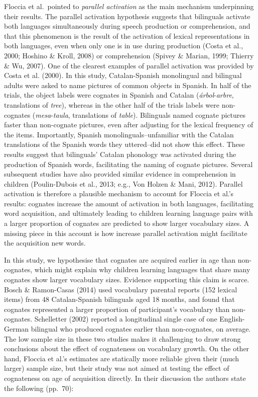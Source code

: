 \documentclass[
  letterpaper,
  DIV=11,
  numbers=noendperiod]{scrartcl}
\begin{document}
Floccia et al.~pointed to \emph{parallel activation} as the main
mechanism underpinning their results. The parallel activation hypothesis
suggests that bilinguals activate both languages simultaneously during
speech production or comprehension, and that this phenomenon is the
result of the activation of lexical representations in both languages,
even when only one is in use during production (Costa et al., 2000;
Hoshino \& Kroll, 2008) or comprehension (Spivey \& Marian, 1999;
Thierry \& Wu, 2007). One of the clearest examples of parallel
activation was provided by Costa et al. (2000). In this study,
Catalan-Spanish monolingual and bilingual adults were asked to name
pictures of common objects in Spanish. In half of the trials, the object
labels were cognates in Spanish and Catalan (\emph{árbol}-\emph{arbre},
translations of \emph{tree}), whereas in the other half of the trials
labels were non-cognates (\emph{mesa}-\emph{taula}, translations of
\emph{table}). Bilinguals named cognate pictures faster than non-cognate
pictures, even after adjusting for the lexical frequency of the items.
Importantly, Spanish monolinguals--unfamiliar with the Catalan
translations of the Spanish words they uttered--did not show this
effect. These results suggest that bilinguals' Catalan phonology was
activated during the production of Spanish words, facilitating the
naming of cognate pictures. Several subsequent studies have also
provided similar evidence in comprehension in children (Poulin-Dubois et
al., 2013; e.g., Von Holzen \& Mani, 2012). Parallel activation is
therefore a plausible mechanism to account for Floccia et al.'s results:
cognates increase the amount of activation in both languages,
facilitating word acquisition, and ultimately leading to children
learning language pairs with a larger proportion of cognates are
predicted to show larger vocabulary sizes. A missing piece in this
account is how increase parallel activation might facilitate the
acquisition new words.

In this study, we hypothesise that cognates are acquired earlier in age
than non-cognates, which might explain why children learning languages
that share many cognates show larger vocabulary sizes. Evidence
supporting this claim is scarce. Bosch \& Ramon-Casas (2014) used
vocabulary parental reports (152 lexical items) from 48 Catalan-Spanish
bilinguals aged 18 months, and found that cognates represented a larger
proportion of participant's vocabulary than non-cognates. Schelletter
(2002) reported a longitudinal single case of one English-German
bilingual who produced cognates earlier than non-cognates, on average.
The low sample size in these two studies makes it challenging to draw
strong conclusions about the effect of cognateness on vocabulary growth.
On the other hand, Floccia et al.'s estimates are statically more
reliable given their (much larger) sample size, but their study was not
aimed at testing the effect of cognateness on age of acquisition
directly. In their discussion the authors state the following (pp.~70):
\end{document}
